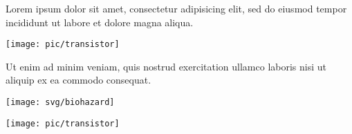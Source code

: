 {
Lorem ipsum dolor sit amet, consectetur adipisicing elit, sed do eiusmod tempor incididunt ut labore et dolore magna aliqua.

\begin{center}
\texttt{[image: pic/transistor]}
\end{center}

Ut enim ad minim veniam, quis nostrud exercitation ullamco laboris nisi ut aliquip ex ea commodo consequat.
}


{
\begin{center}
\texttt{[image: svg/biohazard]}
\end{center}
}


\slide{} %
{
\begin{center}
\texttt{[image: pic/transistor]}
\end{center}
}
